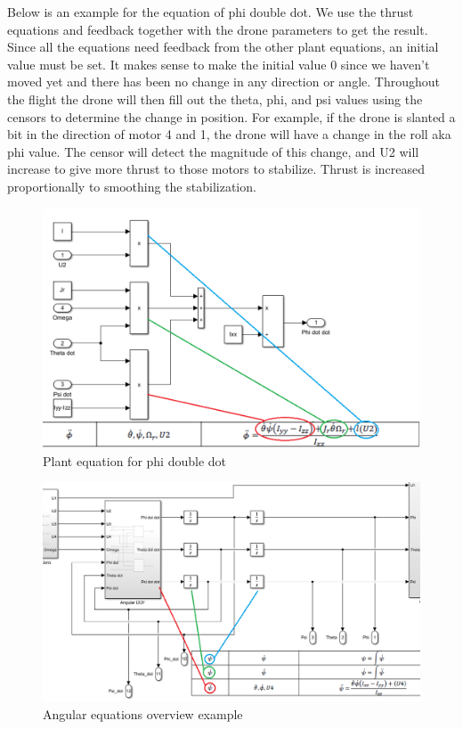 Below is an example for the equation of phi double dot. We use the thrust equations and feedback together with the drone parameters to get the result. Since all the equations need feedback from the other plant equations, an initial value must be set. It makes sense to make the initial value 0 since we haven’t moved yet and there has been no change in any direction or angle. Throughout the flight the drone will then fill out the theta, phi, and psi values using the censors to determine the change in position. For example, if the drone is slanted a bit in the direction of motor 4 and 1, the drone will have a change in the roll aka phi value. The censor will detect the magnitude of this change, and U2 will increase to give more thrust to those motors to stabilize. Thrust is increased proportionally to smoothing the stabilization. 

\begin{figure}[H]
\begin{center}
   \includegraphics[scale =0.7]{pictures/control/plant equation phi example.png}
\end{center}
\caption{Plant equation for phi double dot}
\end{figure}

\begin{figure}[H]
\begin{center}
   \includegraphics[scale =0.6]{pictures/control/plant pic1.png}
\end{center}
\caption{Angular equations overview example}
\end{figure}

